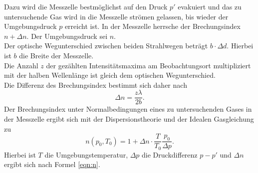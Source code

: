 Dazu wird die Messzelle bestmöglichst auf den Druck $p'$ evakuiert und das zu untersuchende Gas wird in die Messzelle strömen gelassen, bis wieder der Umgebungsdruck $p$ erreicht ist.
In der Messzelle herrsche der Brechungsindex $n+ \Delta n$. Der Umgebungsdruck sei $n$.
\\Der optische Wegunterschied zwischen beiden Strahlwegen beträgt $b\cdot \Delta d$. Hierbei ist $b$ die Breite der Messzelle.
\\Die Anzahl $z$ der gezählten Intensitätsmaxima am Beobachtungsort multipliziert mit der halben Wellenlänge ist gleich dem optischen Wegunterschied.
\\Die Differenz des Brechungsindex bestimmt sich daher nach
\begin{equation}
\label{eqn:deltan}
\Delta n= \frac{z \lambda}{2b} \text{.}
\end{equation}
Der Brechungsindex unter Normalbedingungen eines zu untersuchenden Gases in der Messzelle ergibt sich mit der Dispersionstheorie und der Idealen Gasgleichung zu
\begin{equation}
\label{eqn:n}
	n(p_0,T_0)=1+\Delta n \cdot \frac{T}{T_0}\frac{p_0}{\Delta p} \text{.}
\end{equation}
Hierbei ist $T$ die Umgebungstemperatur, $\Delta p$ die Druckdifferenz $p-p'$ und $\Delta n$ ergibt sich nach Formel \eqref{eqn:n}.
